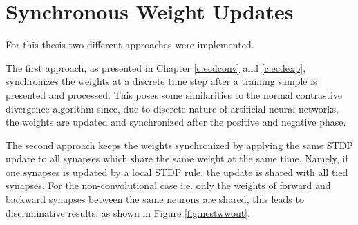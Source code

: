 \section{Synchronous Weight Updates} \label{fig:ecdnestconv}

For this thesis two different approaches were implemented. 

The first approach, as presented in Chapter \ref{c:ecdconv} and \ref{c:ecdexp}, synchronizes the weights at a discrete time step after a training sample is presented and processed.
This poses some similarities to the normal contrastive divergence algorithm since, due to discrete nature of artificial neural networks, the weights are updated and synchronized after the positive and negative phase.  

The second approach keeps the weights synchronized by applying the same STDP update to all synapses which share the same weight at the same time. 
Namely, if one synapses is updated by a local STDP rule, the update is shared with all tied synapses.
For the non-convolutional case i.e. only the weights of forward and backward synapses between the same neurons are shared, this leads to discriminative results, as shown in Figure \ref{fig:nestwwout}.

